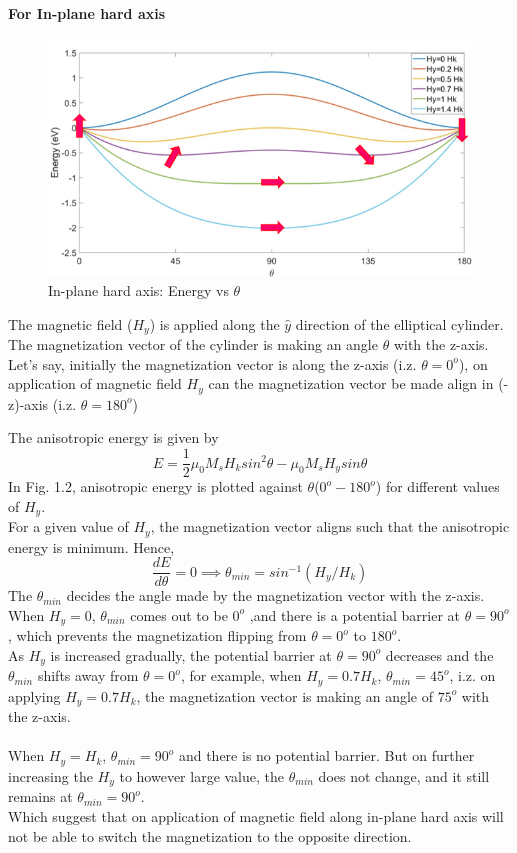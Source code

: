 \textbf{For In-plane hard axis}\\
\begin{figure}[H]
	\centering
   \includegraphics[scale=0.56]{Images/20.png} 
   \caption{In-plane hard axis: Energy vs $\theta$}
\end{figure}
The magnetic field (\textbf{$H_y$}) is applied along the $\hat{y}$ direction of the elliptical cylinder. The magnetization vector of the cylinder is making an angle $\theta$ with the z-axis. Let's say, initially the magnetization vector is along the z-axis (i.z. $\theta=0^o$), on application of magnetic field $H_y$ can the magnetization vector be made align in (-z)-axis (i.z. $\theta=180^o$)

The anisotropic energy is given by 
\[E=\frac{1}{2}\mu_0M_sH_ksin^2\theta - \mu_0M_sH_ysin\theta\]
In Fig. 1.2, anisotropic energy is plotted against $\theta$($0^o - 180^o$) for different values of $H_y$.\\
For a given value of $H_y$, the magnetization vector aligns such that the anisotropic energy is minimum. Hence, \[\frac{dE}{d\theta}=0 \implies \theta_{min}=sin^{-1}(H_y/H_k)\]
The $\theta_{min}$ decides the angle made by the magnetization vector with the z-axis. \\
When $H_y=0$, $\theta_{min}$ comes out to be $0^o$ ,and there is a potential barrier at $\theta=90^o$, which prevents the magnetization flipping from $\theta=0^o$ to $180^o$. \\
As $H_y$ is increased gradually, the potential barrier at $\theta=90^o$ decreases and the $\theta_{min}$ shifts away from $\theta=0^o$, for example, when $H_y=0.7H_k$, $\theta_{min}=45^o$, i.z. on applying $H_y=0.7H_k$, the magnetization vector is making an angle of $75^o$ with the z-axis.\\\\
When $H_y=H_k$, $\theta_{min}=90^o$ and there is no potential barrier. But on further increasing the $H_y$ to however large value, the $\theta_{min}$ does not change, and it still remains at $\theta_{min}=90^o$.\\
Which suggest that on application of magnetic field along in-plane hard axis will not be able to switch the magnetization to the opposite direction.\\\\

